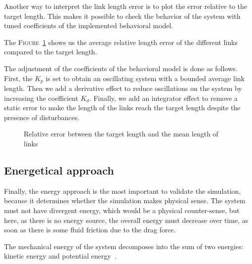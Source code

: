 Another way to interpret the link length error is to plot the error relative to the target length. This makes it possible to check the behavior of the system with tuned coefficients of the implemented behavioral model.

The \textsc{Figure}~\ref{fig:error_length} shows us the average relative length error of the different links compared to the target length.

The adjustment of the coefficients of the behavioral model is done as follows. First, the $K_p$ is set to obtain an oscillating system with a bounded average link length. Then we add a derivative effect to reduce oscillations on the system by increasing the coefficient $K_d$. Finally, we add an integrator effect to remove a static error to make the length of the links reach the target length despite the presence of disturbances.

\begin{figure}[!htb]
    \centering
    
    \caption{Relative error between the target length and the mean length of links}
    \label{fig:error_length}
\end{figure}

\subsection{Energetical approach}

Finally, the energy approach is the most important to validate the simulation, because it determines whether the simulation makes physical sense. The system must not have divergent energy, which would be a physical counter-sense, but here, as there is no energy source, the overall energy must decrease over time, as soon as there is some fluid friction due to the drag force.

The mechanical energy of the system decomposes into the sum of two energies: kinetic energy and potential energy~\cite{viegas2004kinetic}.

